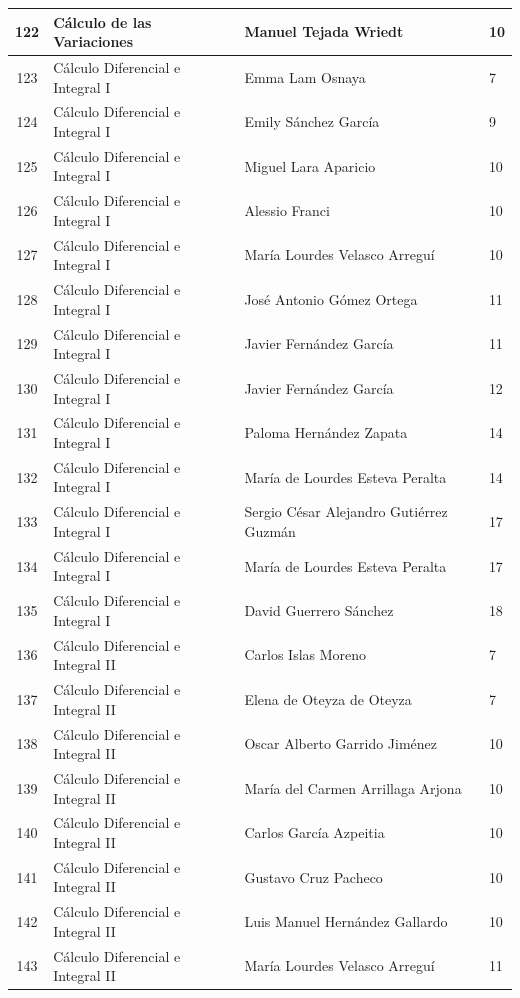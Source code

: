 {\begin{longtable}{|c|p{6.5cm}|p{5cm}|p{1.5cm}|}
  122 & Cálculo de las Variaciones & Manuel Tejada Wriedt & 10 \\ \hline
  123 & Cálculo Diferencial e Integral I & Emma Lam Osnaya & 7 \\ \hline
  124 & Cálculo Diferencial e Integral I & Emily Sánchez García & 9 \\ \hline
  125 & Cálculo Diferencial e Integral I & Miguel Lara Aparicio & 10 \\ \hline
  126 & Cálculo Diferencial e Integral I & Alessio Franci & 10 \\ \hline
  127 & Cálculo Diferencial e Integral I & María Lourdes Velasco Arreguí & 10 \\ \hline
  128 & Cálculo Diferencial e Integral I & José Antonio Gómez Ortega & 11 \\ \hline
  129 & Cálculo Diferencial e Integral I & Javier Fernández García & 11 \\ \hline
  130 & Cálculo Diferencial e Integral I & Javier Fernández García & 12 \\ \hline
  131 & Cálculo Diferencial e Integral I & Paloma Hernández Zapata & 14 \\ \hline
  132 & Cálculo Diferencial e Integral I & María de Lourdes Esteva Peralta & 14 \\ \hline
  133 & Cálculo Diferencial e Integral I & Sergio César Alejandro Gutiérrez Guzmán & 17 \\ \hline
  134 & Cálculo Diferencial e Integral I & María de Lourdes Esteva Peralta & 17 \\ \hline
  135 & Cálculo Diferencial e Integral I & David Guerrero Sánchez & 18 \\ \hline
  136 & Cálculo Diferencial e Integral II & Carlos Islas Moreno & 7 \\ \hline
  137 & Cálculo Diferencial e Integral II & Elena de Oteyza de Oteyza & 7 \\ \hline
  138 & Cálculo Diferencial e Integral II & Oscar Alberto Garrido Jiménez & 10 \\ \hline
  139 & Cálculo Diferencial e Integral II & María del Carmen Arrillaga Arjona & 10 \\ \hline
  140 & Cálculo Diferencial e Integral II & Carlos García Azpeitia & 10 \\ \hline
  141 & Cálculo Diferencial e Integral II & Gustavo Cruz Pacheco & 10 \\ \hline
  142 & Cálculo Diferencial e Integral II & Luis Manuel Hernández Gallardo & 10 \\ \hline
  143 & Cálculo Diferencial e Integral II & María Lourdes Velasco Arreguí & 11 \\ \hline

\end{longtable}}
